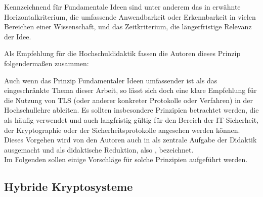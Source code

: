 Kennzeichnend für Fundamentale Ideen sind unter anderem das in \cite{schubert11} erwähnte Horizontalkriterium, die umfassende Anwendbarkeit oder Erkennbarkeit in vielen Bereichen einer Wissenschaft, und das Zeitkriterium, die längerfristige Relevanz der Idee. 

Als Empfehlung für die Hochschuldidaktik fassen die Autoren dieses Prinzip folgendermaßen zusammen:

\begin{quote}
 \cite{schubert11}
\end{quote}

Auch wenn das Prinzip Fundamentaler Ideen umfassender ist als das eingeschränkte Thema dieser Arbeit, so lässt sich doch eine klare Empfehlung für die Nutzung von TLS (oder anderer konkreter Protokolle oder Verfahren) in der Hochschullehre ableiten. Es sollten  insbesondere Prinzipien betrachtet werden, die als häufig verwendet und auch langfristig gültig für den Bereich der IT-Sicherheit, der Kryptographie oder der Sicherheitsprotokolle angesehen werden können.\\
Dieses Vorgehen wird von den Autoren auch in \cite{kluever12} als zentrale Aufgabe der Didaktik ausgemacht und als didaktische Reduktion, also , bezeichnet.\\
Im Folgenden sollen einige Vorschläge für solche Prinzipien aufgeführt werden.

\subsection{Hybride Kryptosysteme}

